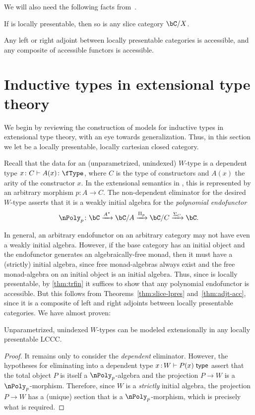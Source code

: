 \documentclass{amsart}
\begin{document}
We will also need the following facts from~\cite{ar:loc-pres}.

\begin{thm}\label{thm:slice-lpres}
  If \bC is locally presentable, then so is any slice category $\bC/X$.
\end{thm}

\begin{thm}\label{thm:adjt-acc}
  Any left or right adjoint between locally presentable categories is accessible, and any composite of accessible functors is accessible.
\end{thm}


\section{Inductive types in extensional type theory}
\label{sec:inductive-ext}

We begin by reviewing the construction of models for inductive types in extensional type theory, with an eye towards generalization.
Thus, in this section we let \bC be a locally presentable, locally cartesian closed category.

Recall that the data for an (unparametrized, unindexed) $W$-type is a dependent type $x\colon C \vdash A(x)\colon\fType$, where $C$ is the type of constructors and $A(x)$ the arity of the constructor $x$.
In the extensional semantics in \bC, this is represented by an arbitrary morphism $p\colon A\to C$.
The non-dependent eliminator for the desired $W$-type asserts that it is a weakly initial algebra for the \emph{polynomial endofunctor}
\[ \nPoly_p\colon \bC \xto{A^*} \bC/A \xto{\Pi_p} \bC/C \xto{\Sigma_C} \bC. \]

In general, an arbitrary endofunctor on an arbitrary category may not have even a weakly initial algebra.
However, if the base category has an initial object and the endofunctor generates an algebraically-free monad, then it must have a (strictly) initial algebra, since free monad-algebras always exist and the free monad-algebra on an initial object is an initial algebra.
Thus, since \bC is locally presentable, by \autoref{thm:trfin} it suffices to show that any polynomial endofunctor is accessible.
But this follows from Theorems~\ref{thm:slice-lpres} and~\ref{thm:adjt-acc}, since it is a composite of left and right adjoints between locally presentable categories.
We have almost proven:

\begin{thm}
  Unparametrized, unindexed $W$-types can be modeled extensionally in any locally presentable LCCC.
\end{thm}
\begin{proof}
  It remains only to consider the \emph{dependent} eliminator.
  However, the hypotheses for eliminating into a dependent type $x \of W \types P(x) \type$ assert that the total object $P$ is itself a $\nPoly_p$-algebra and the projection $P\to W$ is a $\nPoly_p$-morphism.
  Therefore, since $W$ is a \emph{strictly} initial algebra, the projection $P\to W$ has a (unique) section that is a $\nPoly_p$-morphism, which is precisely what is required.
\end{proof}
\end{document}
